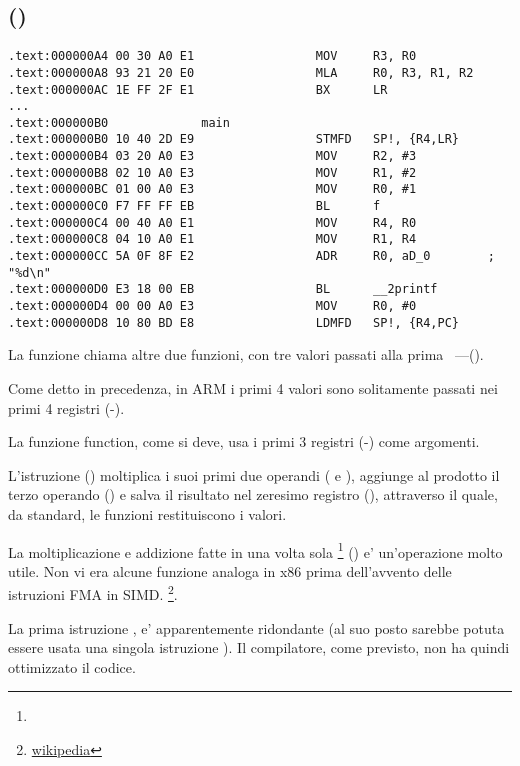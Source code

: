\subsection{\NonOptimizingKeilVI (\ARMMode)}

\begin{lstlisting}
.text:000000A4 00 30 A0 E1                 MOV     R3, R0
.text:000000A8 93 21 20 E0                 MLA     R0, R3, R1, R2
.text:000000AC 1E FF 2F E1                 BX      LR
...
.text:000000B0             main
.text:000000B0 10 40 2D E9                 STMFD   SP!, {R4,LR}
.text:000000B4 03 20 A0 E3                 MOV     R2, #3
.text:000000B8 02 10 A0 E3                 MOV     R1, #2
.text:000000BC 01 00 A0 E3                 MOV     R0, #1
.text:000000C0 F7 FF FF EB                 BL      f
.text:000000C4 00 40 A0 E1                 MOV     R4, R0
.text:000000C8 04 10 A0 E1                 MOV     R1, R4
.text:000000CC 5A 0F 8F E2                 ADR     R0, aD_0        ; "%d\n"
.text:000000D0 E3 18 00 EB                 BL      __2printf
.text:000000D4 00 00 A0 E3                 MOV     R0, #0
.text:000000D8 10 80 BD E8                 LDMFD   SP!, {R4,PC}
\end{lstlisting}

La funzione \main chiama altre due funzioni, con tre valori passati alla prima ~---(\ttf).

Come detto in precedenza, in ARM i primi 4 valori sono solitamente passati nei primi 4 registri (-).

La funzione \ttf function, come si deve, usa i primi 3 registri (-) come argomenti.

L'istruzione  () 
moltiplica i suoi primi due operandi ( e ), aggiunge al prodotto il terzo operando () e salva il risultato
nel zeresimo registro (), attraverso il quale, da standard, le funzioni restituiscono i valori.

La moltiplicazione e addizione fatte in una volta sola \footnote{\WPMAO} () e' un'operazione molto utile. 
Non vi era alcune funzione analoga in x86 prima dell'avvento delle istruzioni FMA in SIMD.
\footnote{\href{http://go.yurichev.com/17103}{wikipedia}}.

La prima istruzione , 
e' apparentemente ridondante (al suo posto sarebbe potuta essere usata una singola istruzione ). 
Il compilatore, come previsto, non ha quindi ottimizzato il codice.

